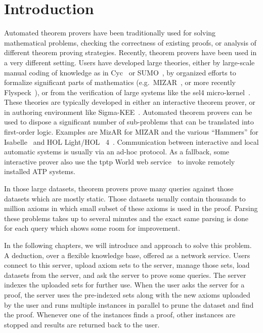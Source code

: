 \chapter{Introduction}
\label{chap:intro}

Automated theorem provers have been traditionally used for solving mathematical problems, checking the correctness of existing proofs, or analysis of different theorem proving strategies. Recently, theorem provers have been used in a very different setting. Users have developed large theories, either by large-scale manual coding of knowledge as in Cyc~\cite{RRG:CO-2005} or SUMO~\cite{PNL:AAAIWS-2002}, by organized efforts to formalize significant parts of mathematics (e.g.~MIZAR~\cite{TB:IJCAI-1985}, or more recently Flyspeck~\cite{HHMNOZ:Kepler-2011}), or from the verification of large systems like the sel4 micro-kernel~\cite{KE:SOSP-2009}. These theories are typically developed in either an interactive theorem prover, or in authoring environment like Sigma-KEE~\cite{PS:IJCAR-2014}. Automated theorem provers can be used to dispose a significant number of sub-problems that can be translated into first-order logic. Examples are MizAR for MIZAR and the various ``Hammers'' for Isabelle~\cite{MP:JAL-2007,MP:JAR-2009,BN:IJCAR-2010} and HOL Light/HOL~ 4~\cite{KU:JAR-2014,GK:CPP-2015}. Communication between interactive and local automatic systems is usually via an ad-hoc protocol. As a fallback, some interactive prover also use the \ac{tptp} World web service~\cite{Sutcliffe:LPAR-2010} to invoke remotely installed ATP systems.

In those large datasets, theorem provers prove many queries against those datasets which are mostly static. Those datasets usually contain thousands to million axioms in which small subset of these axioms is used in the proof. Parsing these problems takes up to several minutes and the exact same parsing is done for each query which shows some room for improvement.

In the following chapters, we will introduce and approach to solve this problem. A deduction, over a flexible knowledge base, offered as a network service. Users connect to this server, upload axiom sets to the server, manage those sets, load datasets from the server, and ask the server to prove some queries. The server indexes the uploaded sets for further use. When the user asks the server for a proof, the server uses the pre-indexed sets along with the new axioms uploaded by the user and runs multiple instances in parallel to prune the dataset and find the proof. Whenever one of the instances finds a proof, other instances are stopped and results are returned back to the user.

